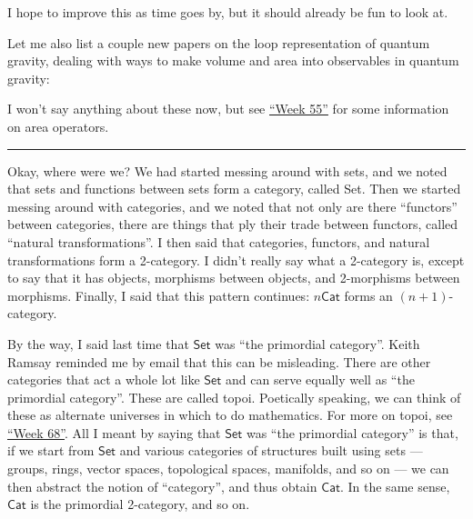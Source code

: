 \documentclass{article}
\renewcommand{\texttt}[1]{%
  \begingroup
  \ttfamily
  \begingroup\lccode`~=`/\lowercase{\endgroup\def~}{/\discretionary{}{}{}}%
  \begingroup\lccode`~=`[\lowercase{\endgroup\def~}{[\discretionary{}{}{}}%
  \begingroup\lccode`~=`.\lowercase{\endgroup\def~}{.\discretionary{}{}{}}%
  \catcode`/=\active\catcode`[=\active\catcode`.=\active
  \scantokens{#1\noexpand}%
  \endgroup
}
\begin{document}
I hope to improve this as time goes by, but it should already be fun to
look at.

Let me also list a couple new papers on the loop representation of
quantum gravity, dealing with ways to make volume and area into
observables in quantum gravity:


I won't say anything about these now, but see
\protect\hyperlink{week55}{``Week 55''} for some information on area
operators.

\begin{center}\rule{0.5\linewidth}{0.5pt}\end{center}

Okay, where were we? We had started messing around with sets, and we
noted that sets and functions between sets form a category, called Set.
Then we started messing around with categories, and we noted that not
only are there ``functors'' between categories, there are things that
ply their trade between functors, called ``natural transformations''. I
then said that categories, functors, and natural transformations form a
2-category. I didn't really say what a 2-category is, except to say that
it has objects, morphisms between objects, and 2-morphisms between
morphisms. Finally, I said that this pattern continues:
\(n\mathsf{Cat}\) forms an \((n+1)\)-category.

By the way, I said last time that \(\mathsf{Set}\) was ``the primordial
category''. Keith Ramsay reminded me by email that this can be
misleading. There are other categories that act a whole lot like
\(\mathsf{Set}\) and can serve equally well as ``the primordial
category''. These are called topoi. Poetically speaking, we can think of
these as alternate universes in which to do mathematics. For more on
topoi, see \protect\hyperlink{week68}{``Week 68''}. All I meant by
saying that \(\mathsf{Set}\) was ``the primordial category'' is that, if
we start from \(\mathsf{Set}\) and various categories of structures
built using sets --- groups, rings, vector spaces, topological spaces,
manifolds, and so on --- we can then abstract the notion of
``category'', and thus obtain \(\mathsf{Cat}\). In the same sense,
\(\mathsf{Cat}\) is the primordial 2-category, and so on.
\end{document}
